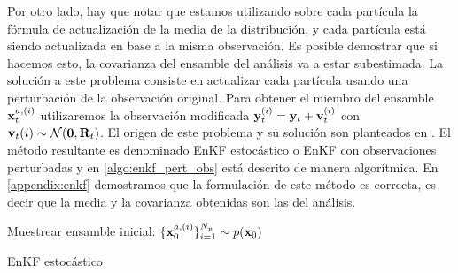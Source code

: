 Por otro lado, hay que notar que estamos utilizando sobre cada partícula la fórmula de actualización de la media de la distribución, y cada partícula está siendo actualizada en base a la misma observación. Es posible demostrar que si hacemos esto, la covarianza del ensamble del análisis va a estar subestimada. La solución a este problema consiste en actualizar cada partícula usando una perturbación de la observación original. Para obtener el miembro del ensamble $\mathbf{x}_t^{a, (i)}$ utilizaremos la observación modificada $\mathbf{y}_t^{(i)} = \mathbf{y}_t + \mathbf{v}_t^{(i)}$ con $\mathbf{v}_t{(i)} \sim \mathcal{N}(\mathbf{0}, \mathbf{R}_t)$. El origen de este problema y su solución son planteados en \cite{Burgers1998}. El método resultante es denominado EnKF estocástico o EnKF con observaciones perturbadas y en \ref{algo:enkf_pert_obs} está descrito de manera algorítmica. En \ref{appendix:enkf} demostramos que la formulación de este método es correcta, es decir que la media y la covarianza obtenidas son las del análisis.

\begin{algorithm}[H]\label{algo:enkf_pert_obs}
    Muestrear ensamble inicial: $\{\mathbf{x}_0^{a, (i)} \}_{i=1}^{N_p} \sim p(\mathbf{x}_0)$
    
\caption{EnKF estocástico}
\end{algorithm}


